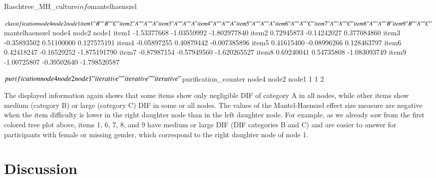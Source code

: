 \documentclass[doc,floatsintext,natbib]{apa7}
\begin{document}
\begin{Schunk}
\begin{Sinput}
 Raschtree_MH_culture$info$mantelhaenszel
\end{Sinput}
\begin{Soutput}
$classification
      node4 node2 node1
item1 "B"   "B"   "C"  
item2 "A"   "A"   "A"  
item3 "A"   "A"   "A"  
item4 "A"   "A"   "A"  
item5 "A"   "A"   "A"  
item6 "A"   "A"   "C"  
item7 "A"   "A"   "C"  
item8 "A"   "A"   "B"  
item9 "B"   "A"   "C"  

$mantelhaenszel
            node4       node2        node1
item1 -1.53377668 -1.03559992 -1.802977840
item2  0.72945873 -0.14242027  0.377084860
item3 -0.35893502  0.51100000  0.127575191
item4 -0.05897255  0.40879442 -0.007385896
item5  0.41615400 -0.08996266  0.128463797
item6  0.42418247 -0.16529252 -1.875191790
item7 -0.87987154 -0.57949560 -1.620265527
item8  0.69240041  0.54735808 -1.083093749
item9 -1.00725807 -0.39502640 -1.798520587

$purification
      node4       node2       node1 
"iterative" "iterative" "iterative" 

$purification_counter
node4 node2 node1 
    1     1     2 
\end{Soutput}
\end{Schunk}

The displayed information again shows that some items show only negligible DIF of category A in all nodes, while other items show medium (category B) or large (category C) DIF in some or all nodes. The values of the Mantel-Haenszel effect size measure are negative when the item difficulty is lower in the right daughter node than in the left daughter node. For example, as we already saw from the first colored tree plot above, items 1, 6, 7, 8, and 9 have medium or large DIF (DIF categories B and C) and are  easier to answer %
for participants with female or missing gender, which correspond to the right daughter node of node 1. %


\FloatBarrier
\section{Discussion}
\end{document}
